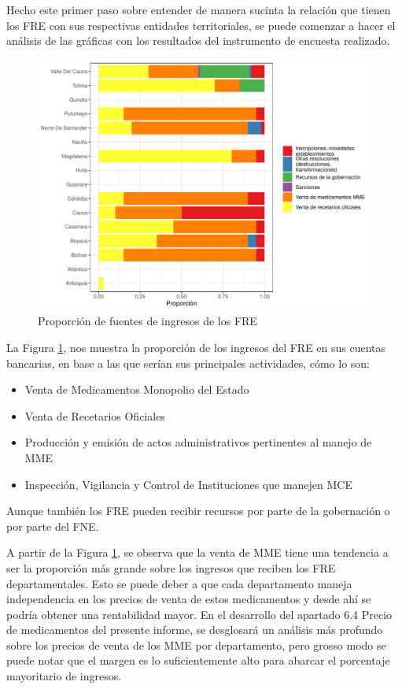 \documentclass[
]{book}
\begin{document}
Hecho este primer paso sobre entender de manera sucinta la relación que tienen los FRE con sus respectivas entidades territoriales, se puede comenzar a hacer el análisis de las gráficas con los resultados del instrumento de encuesta realizado.

\begin{figure}
\includegraphics[width=0.85\linewidth]{InformeFinal_files/figure-latex/IngresosFRE1-1} \caption{Proporción de fuentes de ingresos de los FRE}\label{fig:IngresosFRE1}
\end{figure}

La Figura \ref{fig:IngresosFRE1}, nos muestra la proporción de los ingresos del FRE en sus cuentas bancarias, en base a las que serían sus principales actividades, cómo lo son:

\begin{itemize}
\item
  Venta de Medicamentos Monopolio del Estado
\item
  Venta de Recetarios Oficiales
\item
  Producción y emisión de actos administrativos pertinentes al manejo de MME
\item
  Inspección, Vigilancia y Control de Instituciones que manejen MCE
\end{itemize}

Aunque también los FRE pueden recibir recursos por parte de la gobernación o por parte del FNE.

A partir de la Figura \ref{fig:IngresosFRE1}, se observa que la venta de MME tiene una tendencia a ser la proporción más grande sobre los ingresos que reciben los FRE departamentales. Esto se puede deber a que cada departamento maneja independencia en los precios de venta de estos medicamentos y desde ahí se podría obtener una rentabilidad mayor. En el desarrollo del apartado 6.4 Precio de medicamentos del presente informe, se desglosará un análisis más profundo sobre los precios de venta de los MME por departamento, pero grosso modo se puede notar que el margen es lo suficientemente alto para abarcar el porcentaje mayoritario de ingresos.
\end{document}
